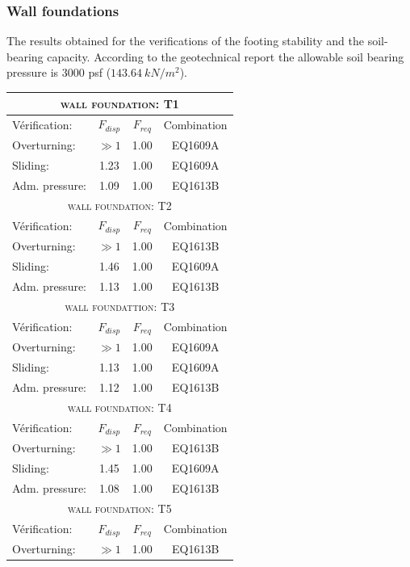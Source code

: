 \subsubsection{Wall foundations}
The results obtained for the verifications of the footing stability and the soil-bearing capacity. According to the geotechnical report the allowable soil bearing pressure is 3000 psf ($143.64\ kN/m^2$).
\begin{center}
\begin{tabular}[H]{|l|c|c|c|}
\hline
\multicolumn{4}{|c|}{\textsc{wall foundation: T1}}\\
\hline
Vérification:  & $F_{disp}$ & $F_{req}$ & Combination\\
\hline
Overturning:  & $\gg 1$ & 1.00 & EQ1609A\\
Sliding:  & 1.23 & 1.00 & EQ1609A\\
Adm. pressure:  & 1.09 & 1.00 & EQ1613B\\
\hline
\multicolumn{4}{|c|}{\textsc{wall foundation: T2}}\\
\hline
Vérification:  & $F_{disp}$ & $F_{req}$ & Combination\\
\hline
Overturning:  & $\gg 1$ & 1.00 & EQ1613B\\
Sliding:  & 1.46 & 1.00 & EQ1609A\\
Adm. pressure:  & 1.13 & 1.00 & EQ1613B\\
\hline
\multicolumn{4}{|c|}{\textsc{wall foundattion: T3}}\\
\hline
Vérification:  & $F_{disp}$ & $F_{req}$ & Combination\\
\hline
Overturning:  & $\gg 1$ & 1.00 & EQ1609A\\
Sliding:  & 1.13 & 1.00 & EQ1609A\\
Adm. pressure:  & 1.12 & 1.00 & EQ1613B\\
\hline
\multicolumn{4}{|c|}{\textsc{wall foundation: T4}}\\
\hline
Vérification:  & $F_{disp}$ & $F_{req}$ & Combination\\
\hline
Overturning:  & $\gg 1$ & 1.00 & EQ1613B\\
Sliding:  & 1.45 & 1.00 & EQ1609A\\
Adm. pressure:  & 1.08 & 1.00 & EQ1613B\\
\hline
\multicolumn{4}{|c|}{\textsc{wall foundation: T5 }}\\
\hline
Vérification:  & $F_{disp}$ & $F_{req}$ & Combination\\
\hline
Overturning:  & $\gg 1$ & 1.00 & EQ1613B\\

\end{tabular}
\end{center}
